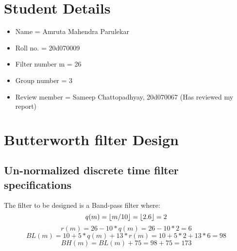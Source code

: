 \documentclass[12pt]{article}
\DeclarePairedDelimiter\floor{\lfloor}{\rfloor}
\begin{document}

\newpage
\tableofcontents
\newpage
\section{Student Details} %
\begin{itemize}[nolistsep]
    \item Name = Amruta Mahendra Parulekar
    \item Roll no. = 20d070009
    \item Filter number m = 26
    \item Group number = 3
    \item Review member = Sameep Chattopadhyay, 20d070067 (Has reviewed my report)
\end{itemize}
\section{Butterworth filter Design}
\subsection{Un-normalized discrete time filter specifications}

  
    The filter to be designed is a Band-pass filter where:
    \begin{equation}
        q(m) = \floor{m/10} = \floor{2.6} = 2
    \end{equation}
    \begin{equation}
        r(m) = 26 - 10*q(m) = 26 - 10*2 = 6
    \end{equation}
    \begin{equation}
        BL(m) = 10 + 5*q(m) + 13*r(m) = 10 + 5*2 + 13*6 = 98
    \end{equation}
    \begin{equation}
        BH(m) = BL(m) + 75 = 98 + 75 = 173
    \end{equation}
  
\end{document}
